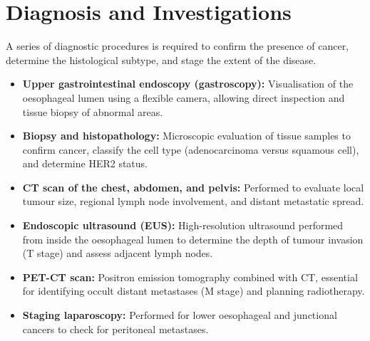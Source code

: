 \section*{Diagnosis and Investigations}
A series of diagnostic procedures is required to confirm the presence of cancer, determine the histological subtype, and stage the extent of the disease.
\begin{itemize}
    \item \textbf{Upper gastrointestinal endoscopy (gastroscopy):} Visualisation of the oesophageal lumen using a flexible camera, allowing direct inspection and tissue biopsy of abnormal areas.
    \item \textbf{Biopsy and histopathology:} Microscopic evaluation of tissue samples to confirm cancer, classify the cell type (adenocarcinoma versus squamous cell), and determine HER2 status.
    \item \textbf{CT scan of the chest, abdomen, and pelvis:} Performed to evaluate local tumour size, regional lymph node involvement, and distant metastatic spread.
    \item \textbf{Endoscopic ultrasound (EUS):} High-resolution ultrasound performed from inside the oesophageal lumen to determine the depth of tumour invasion (T stage) and assess adjacent lymph nodes.
    \item \textbf{PET-CT scan:} Positron emission tomography combined with CT, essential for identifying occult distant metastases (M stage) and planning radiotherapy.
    \item \textbf{Staging laparoscopy:} Performed for lower oesophageal and junctional cancers to check for peritoneal metastases.
\end{itemize}

